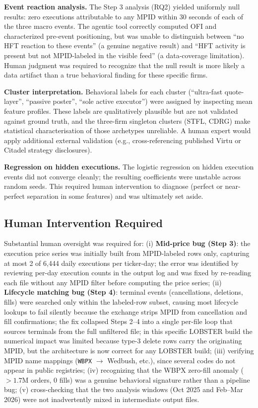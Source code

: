 \documentclass[11pt, letterpaper]{article}
\begin{document}
\textbf{Event reaction analysis.}
The Step 3 analysis (RQ2) yielded uniformly null results: zero executions
attributable to any MPID within 30 seconds of each of the three macro events.
The agentic tool correctly computed OFI and characterized pre-event
positioning, but was unable to distinguish between ``no HFT reaction to
these events'' (a genuine negative result) and ``HFT activity is present but
not MPID-labeled in the visible feed'' (a data-coverage limitation).
Human judgment was required to recognize that the null result is more likely
a data artifact than a true behavioral finding for these specific firms.

\textbf{Cluster interpretation.}
Behavioral labels for each cluster (``ultra-fast quote-layer'',
``passive poster'', ``sole active executor'') were assigned by inspecting mean
feature profiles.
These labels are qualitatively plausible but are not validated against
ground truth, and the three-firm singleton clusters (STFL, CDRG) make
statistical characterisation of those archetypes unreliable.
A human expert would apply additional external validation (e.g., cross-referencing
published Virtu or Citadel strategy disclosures).

\textbf{Regression on hidden executions.}
The logistic regression on hidden execution events did not converge cleanly;
the resulting coefficients were unstable across random seeds.
This required human intervention to diagnose (perfect or near-perfect
separation in some features) and was ultimately set aside.

\subsection{Human Intervention Required}

Substantial human oversight was required for:
(i) \textbf{Mid-price bug (Step 3)}: the execution price series was initially
built from MPID-labeled rows only, capturing at most 2 of 6,444 daily
executions per ticker-day; the error was identified by reviewing per-day
execution counts in the output log and was fixed by re-reading each file
without any MPID filter before computing the price series;
(ii) \textbf{Lifecycle matching bug (Step 4)}: terminal events (cancellations,
deletions, fills) were searched only within the labeled-row subset, causing
most lifecycle lookups to fail silently because the exchange strips MPID
from cancellation and fill confirmations; the fix collapsed Steps 2--4 into
a single per-file loop that sources terminals from the full unfiltered file;
in this specific LOBSTER build the numerical impact was limited because
type-3 delete rows carry the originating MPID, but the architecture is now
correct for any LOBSTER build;
(iii) verifying MPID name mappings (\texttt{WBPX} $\to$ Wedbush, etc.), since
several codes do not appear in public registries;
(iv) recognizing that the WBPX zero-fill anomaly ($>1.7$M orders, 0 fills)
was a genuine behavioral signature rather than a pipeline bug;
(v) cross-checking that the two analysis windows (Oct 2025 and Feb--Mar 2026)
were not inadvertently mixed in intermediate output files.
\end{document}

